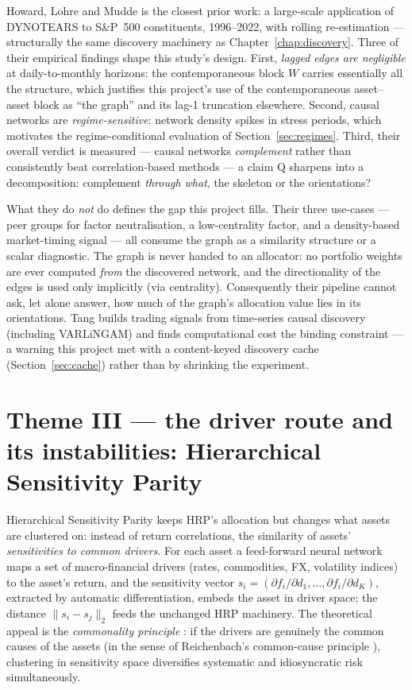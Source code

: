 Howard, Lohre and Mudde \cite{howard2025causal} is the closest prior work: a
large-scale application of DYNOTEARS to S\&P~500 constituents, 1996--2022,
with rolling re-estimation --- structurally the same discovery machinery as
Chapter~\ref{chap:discovery}. Three of their empirical findings shape this
study's design. First, \emph{lagged edges are negligible} at daily-to-monthly
horizons: the contemporaneous block $W$ carries essentially all the
structure, which justifies this project's use of the contemporaneous
asset--asset block as ``the graph'' and its lag-1 truncation elsewhere.
Second, causal networks are \emph{regime-sensitive}: network density spikes
in stress periods, which motivates the regime-conditional evaluation of
Section~\ref{sec:regimes}. Third, their overall verdict is measured ---
causal networks \emph{complement} rather than consistently beat
correlation-based methods --- a claim Q sharpens into a decomposition:
complement \emph{through what}, the skeleton or the orientations?

What they do \emph{not} do defines the gap this project fills. Their three
use-cases --- peer groups for factor neutralisation, a low-centrality factor,
and a density-based market-timing signal --- all consume the graph as a
similarity structure or a scalar diagnostic. The graph is never handed to an
allocator: no portfolio weights are ever computed \emph{from} the discovered
network, and the directionality of the edges is used only implicitly (via
centrality). Consequently their pipeline cannot ask, let alone answer, how
much of the graph's allocation value lies in its orientations. Tang
\cite{tang2024trading} builds trading signals from time-series causal
discovery (including VARLiNGAM) and finds computational cost the binding
constraint --- a warning this project met with a content-keyed discovery
cache (Section~\ref{sec:cache}) rather than by shrinking the experiment.

\section{Theme III --- the driver route and its instabilities:
Hierarchical Sensitivity Parity}
\label{sec:hsp-theme}

Hierarchical Sensitivity Parity \cite{rodriguez2023hsp} keeps HRP's
allocation but changes what assets are clustered on: instead of return
correlations, the similarity of assets' \emph{sensitivities to common
drivers}. For each asset a feed-forward neural network maps a set of
macro-financial drivers (rates, commodities, FX, volatility indices) to the
asset's return, and the sensitivity vector
$s_i = (\partial f_i/\partial d_1, \ldots, \partial f_i/\partial d_K)$,
extracted by automatic differentiation, embeds the asset in driver space; the
distance $\lVert s_i - s_j\rVert_2$ feeds the unchanged HRP machinery. The
theoretical appeal is the \emph{commonality principle}
\cite{rodriguez2023hsp,rodriguez2025causal}: if the drivers are genuinely the
common causes of the assets (in the sense of Reichenbach's common-cause
principle \cite{hitchcock2020reichenbach}), clustering in sensitivity space
diversifies systematic and idiosyncratic risk simultaneously.

